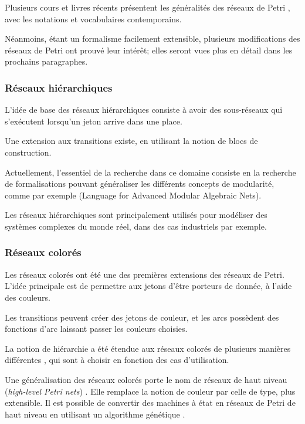 Plusieurs cours et livres récents présentent les généralités des réseaux de Petri \citep[voir][]{david2010discrete, diaz2013petri}, avec les notations et vocabulaires contemporains.

Néanmoins, étant un formalisme facilement extensible, plusieurs modifications des réseaux de Petri ont prouvé leur intérêt; elles seront vues plus en détail dans les prochains paragraphes.
\subsubsection{Réseaux hiérarchiques}
L'idée de base des réseaux hiérarchiques consiste à avoir des sous-réseaux qui s'exécutent lorsqu'un jeton arrive dans une place.

Une extension aux transitions existe, en utilisant la notion de blocs de construction\cite{fehling1993concept}.

Actuellement, l'essentiel de la recherche dans ce domaine consiste en la recherche de formalisations pouvant généraliser les différents concepts de modularité, comme par exemple  (Language for Advanced Modular Algebraic Nets)\cite{colom2013application}.

Les réseaux hiérarchiques sont principalement utilisés pour modéliser des systèmes complexes du monde réel, dans des cas industriels par exemple.

\subsubsection{Réseaux colorés}
Les réseaux colorés\cite{zervos1977colored,jensen1987coloured} ont été une des premières extensions des réseaux de Petri. L'idée principale est de permettre aux jetons d'être porteurs de donnée, à l'aide des couleurs. 

Les transitions peuvent créer des jetons de couleur, et les arcs possèdent des fonctions d'arc laissant passer les couleurs choisies.

La notion de hiérarchie a été étendue aux réseaux colorés de plusieurs manières différentes \cite{rozenberg1991advances}, qui sont à choisir en fonction des cas d'utilisation.

Une généralisation des réseaux colorés porte le nom de réseaux de haut niveau (\textit{high-level Petri nets}) \cite{jensen1983high}. Elle remplace la notion de couleur par celle de type, plus extensible.
Il est possible de convertir des machines à état  en réseaux de Petri de haut niveau en utilisant un algorithme génétique \cite{alhroob2014transforming}.

